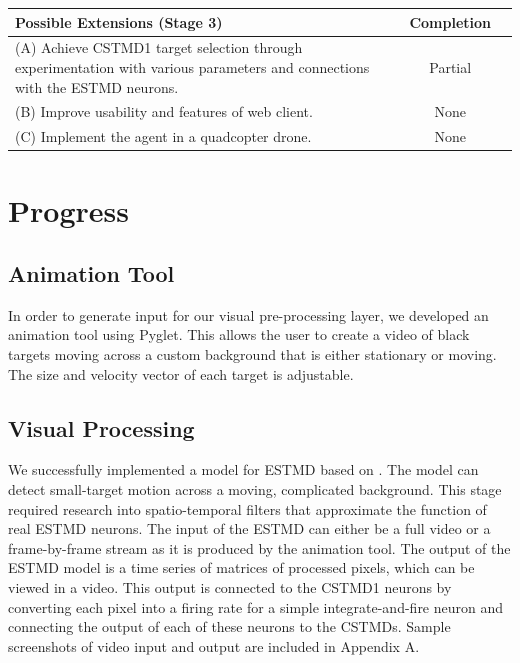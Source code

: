 \documentclass[a4paper,11pt]{article}
\begin{document}
\begin{center}
    \begin{tabular}{p{12cm} c c}
    \textbf{Possible Extensions (Stage 3)} & \textbf{Completion} \\ \hline
	(A) Achieve CSTMD1 target selection through experimentation with various parameters and connections with the ESTMD neurons. & Partial\\
	(B) Improve usability and features of web client. & None\\
	(C) Implement the agent in a quadcopter drone. & None\\
    \end{tabular}
\end{center}


\section{Progress}

\subsection{Animation Tool}
In order to generate input for our visual pre-processing layer, we developed an animation tool using Pyglet. This allows the user to create a video of black targets moving across a custom background that is either stationary or moving. The size and velocity vector of each target is adjustable.

\subsection{Visual Processing}
We successfully implemented a model for ESTMD based on \cite{hal11}. The model can detect small-target motion across a moving, complicated background. This stage required research into spatio-temporal filters that approximate the function of real ESTMD neurons. The input of the ESTMD can either be a full video or a frame-by-frame stream as it is produced by the animation tool. The output of the ESTMD model is a time series of matrices of processed pixels, which can be viewed in a video. This output is connected to the CSTMD1 neurons by converting each pixel into a firing rate for a simple integrate-and-fire neuron and connecting the output of each of these neurons to the CSTMDs. Sample screenshots of video input and output are included in Appendix A.
\end{document}
